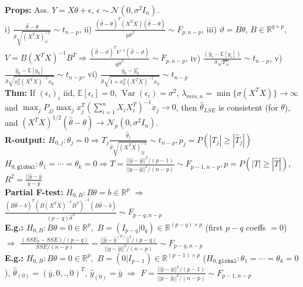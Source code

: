 \documentclass[11pt]{article}
\newcommand{\R}{\mathbb{R}}
\newcommand{\E}{\mathbb{E}}
\DeclareMathOperator*{\V}{Var}
\begin{document}
\begin{multicols}{4}
\textbf{Props:} Ass. $Y=X\theta+\epsilon$, $\epsilon\sim\mathcal{N}(0,\sigma^2I_n)$.\\ i) $\frac{\hat{\theta}-\theta}{\hat{\sigma}\sqrt{(X^TX)^{-1}_{ii}}}\sim t_{n-p}$, ii) $\frac{(\hat{\theta}-\theta)^T(X^TX)(\hat{\theta}-\theta)}{p\hat{\sigma}^2}\sim F_{p,n-p}$, iii) $\vartheta=B\theta$, $B\in\R^{q\times p}$, $V=B(X^TX)^{-1}B^T\Rightarrow\frac{(\hat{\vartheta}-\vartheta)^T V^{-1}(\hat{\vartheta}-\vartheta)}{q\hat{\sigma}^2}\sim F_{p, n-p}$, iv) $\frac{(\hat{y}_i-\E[y_i])}{\hat{\sigma}\sqrt{P_{ii}}}\sim t_{n-p}$, v) $\frac{\hat{y}_0-\E[y_0]}{\hat{\sigma}\sqrt{x_0^T(X^T X)^{-1}x_0}}\sim t_{n-p}$, vi) $\frac{y_0-\hat{y_0}}{\hat{\sigma}\sqrt{1+x_0^T(X^TX)^{-1}x_0}}\sim t_{n-p}$\\

\textbf{Thm:} If $(\epsilon_i)_i$ iid, $\E[\epsilon_i]=0$, $\V (\epsilon_i)=\sigma^2$, $\lambda_{min,n}=\min \{ \sigma(X^TX)\}\rightarrow\infty$ and $\max_j P_{jj}\max_j x_j^T(\sum^n_{i=1}X_iX_i^T)^{-1}x_j\rightarrow 0$, then $\hat{\theta}_{LSE}$ is consistent (for $\theta$), and $(X^TX)^{1/2}(\hat{\theta}-\theta)\rightarrow \mathcal{N}_p(0,\sigma^2 I_n)$.\\

\textbf{R-output:} $H_{0,j}:\theta_j=0\Rightarrow T_j\frac{\hat{\theta}_j}{\hat{\sigma}\sqrt{(X^TX)^{-1}_{jj}}}\sim t_{n-p}, p_j=P(|T_j|\geq |\hat{T}_j|)$\\
$H_{0,\texttt{global}}:\theta_1=\cdots=\theta_k=0\Rightarrow T=\frac{||\hat{y}-\bar{y}||^2/(p-1)}{||y-\hat{y}||^2/(n-p)}\sim F_{p-1,n-p}, p=P(|T|\geq |\hat{T}|)$, $R^2=\frac{||\hat{y}-\bar{y}}{y-\bar{y}}$\\

\textbf{Partial F-test:} $H_{0,B}:B\theta=b\in\R^p$ $\Rightarrow$ $\frac{(B\hat{\theta}-b)^T(B(X^TX)^{-1}B^T)^{-1}(B\hat{\theta}-b)}{(p-q)\hat{\sigma}^2}\sim F_{p-q,n-p}$\\

\textbf{E.g.:} $H_{0,B}:B\theta=0\in\R^p,$ $B=(I_{p-q}|0_q)\in\R^{(p-q)\times p}$ (first $p-q$ coeffs $=0$) $\Rightarrow$ $\frac{(SSE_0-SSE)/(p-q)}{SSE/(n-p)}=\frac{||\hat{y}-\hat{y}^{(0)}||^2/(p-q)}{||y-\hat{y}||^2/(n-p)}\sim F_{p-q,n-p}$\\

\textbf{E.g.:} $H_{0,B}:B\theta=0\in\R^p,$ $B=(0|I_{p-1})\in\R^{(p-1)\times p}$ ($H_{0,\texttt{global}}:\theta_1=\cdots=\theta_k=0$), $\hat{\theta}_{(0)}=(\bar{y},0,.,0)^T$, $\hat{y}_{(0)}=\bar{y}$ $\Rightarrow$ $F=\frac{||\hat{y}-\bar{y}||^2/(p-1)}{||y-\hat{y}||^2/(n-p)}\sim F_{p-1,n-p}$\\


\end{multicols}
\end{document}

